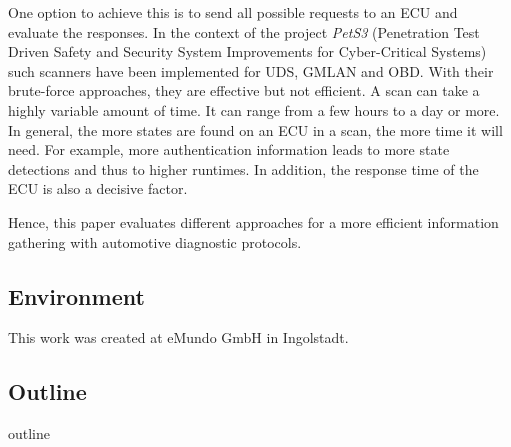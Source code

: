 One option to achieve this is to send all possible requests to an ECU and evaluate the responses. In the context of the project \emph{PetS3} (Penetration Test Driven Safety and Security System Improvements for Cyber-Critical Systems) such scanners have been implemented for UDS, GMLAN and OBD. With their brute-force approaches, they are effective but not efficient. A scan can take a highly variable amount of time. It can range from a few hours to a day or more. In general, the more states are found on an ECU in a scan, the more time it will need. For example, more authentication information leads to more state detections and thus to higher runtimes. In addition, the response time of the ECU is also a decisive factor.

Hence, this paper evaluates different approaches for a more efficient information gathering with automotive diagnostic protocols.

\subsection{Environment}
This work was created at eMundo GmbH in Ingolstadt.

\subsection{Outline}
outline